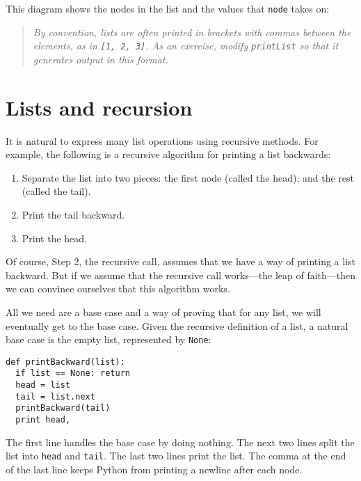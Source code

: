 
This diagram shows the nodes in the list and the values that
{\tt node} takes on:

\beforefig
\centerline{}
\afterfig

\begin{quote}
{\em By convention, lists are often printed in brackets with commas
between the elements, as in {\tt [1, 2, 3]}.  As an exercise, modify
{\tt printList} so that it generates output in this format.}
\end{quote}


\section{Lists and recursion}
\label{listrecursion}

It is natural to express many list operations using recursive methods.
For example, the following is a recursive algorithm for printing a list
backwards:

\begin{enumerate}

\item Separate the list into two pieces: the first node (called
the head); and the rest (called the tail).

\item Print the tail backward.

\item Print the head.

\end{enumerate}

Of course, Step 2, the recursive call, assumes that we have a way of
printing a list backward.  But if we assume that the recursive
call works---the leap of faith---then we can convince ourselves that
this algorithm works.


All we need are a base case and a way of proving that for
any list, we will eventually get to the base case.  Given the
recursive definition of a list, a natural base case is
the empty list, represented by {\tt None}:

\beforeverb
\begin{verbatim}
def printBackward(list):
  if list == None: return
  head = list
  tail = list.next
  printBackward(tail)
  print head,
\end{verbatim}
\afterverb
%
The first line handles the base case by doing nothing.  The
next two lines split the list into {\tt head} and {\tt tail}.
The last two lines print the list.  The comma at the end of the
last line keeps Python from printing a newline after each node.

